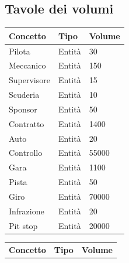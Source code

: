 \documentclass[11pt]{article}
\begin{document}
\subsection{Tavole dei volumi}
\begin{center}
    \begin{tabular}{ |l|l|l| }
        \hline
        \textbf{Concetto} & \textbf{Tipo} & \textbf{Volume} \\
        
        \hline
        Pilota & Entità & 30 \\
        \hline
        Meccanico & Entità & 150 \\
        \hline
        Supervisore & Entità & 15 \\
        \hline
        Scuderia & Entità & 10 \\
        \hline
        Sponsor & Entità & 50 \\
        \hline
        Contratto & Entità & 1400 \\
        \hline
        Auto & Entità & 20 \\
        \hline
        Controllo & Entità & 55000 \\ %
        \hline
        Gara & Entità & 1100 \\
        \hline
        Pista & Entità & 50 \\
        \hline
        Giro & Entità & 70000 \\ %
        \hline
        Infrazione & Entità & 20 \\
        \hline
        Pit stop & Entità & 20000 \\
        \hline
    \end{tabular}
        \quad
    \begin{tabular}{ |l|l|l| }
        \hline
        \textbf{Concetto} & \textbf{Tipo} & \textbf{Volume} \\


\end{tabular}
\end{center}
\end{document}
